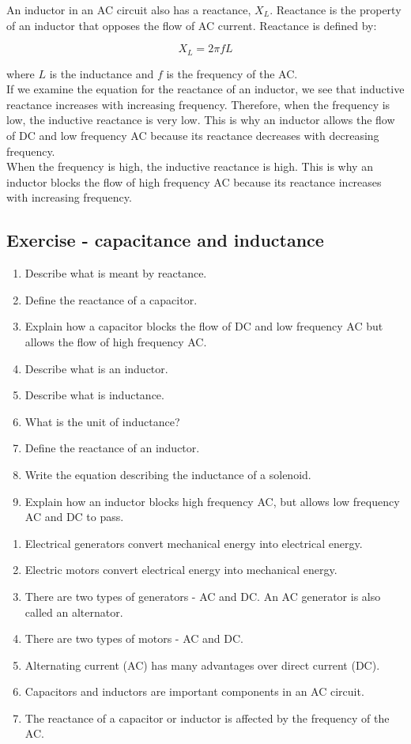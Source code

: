 An inductor in an AC circuit also has a reactance, $X_L$. Reactance is the property of an inductor that opposes the flow of AC current. Reactance is defined by:

\begin{equation*}
X_L = 2\pi fL
\end{equation*}
 
where $L$ is the inductance and $f$ is the frequency of the AC.\\
 
If we examine the equation for the reactance of an inductor, we see that inductive reactance increases with increasing frequency. Therefore, when the frequency is low, the inductive reactance is very low. This is why an inductor allows the flow of DC and low frequency AC because its reactance decreases with decreasing frequency.\\ 
 
When the frequency is high, the inductive reactance is high. This is why an inductor blocks the flow of high frequency AC because its reactance increases with increasing frequency.

\subsection {Exercise - capacitance and inductance}
\begin{enumerate}
\item Describe what is meant by reactance.
\item Define the reactance of a capacitor.
\item Explain how a capacitor blocks the flow of DC and low frequency AC but allows the flow of high frequency AC.
\item Describe what is an inductor.
\item Describe what is inductance.
\item What is the unit of inductance?
\item Define the reactance of an inductor.
\item Write the equation describing the inductance of a solenoid.
\item Explain how an inductor blocks high frequency AC, but allows low frequency AC and DC to pass.
\end{enumerate}

\begin{enumerate}
\item Electrical generators convert mechanical energy into electrical energy.
\item Electric motors convert electrical energy into mechanical energy.
\item There are two types of generators - AC and DC. An AC generator is also called an alternator.
\item There are two types of motors - AC and DC.
\item Alternating current (AC) has many advantages over direct current (DC).
\item Capacitors and inductors are important components in an AC circuit.
\item The reactance of a capacitor or inductor is affected by the frequency of the AC.
\end{enumerate}

